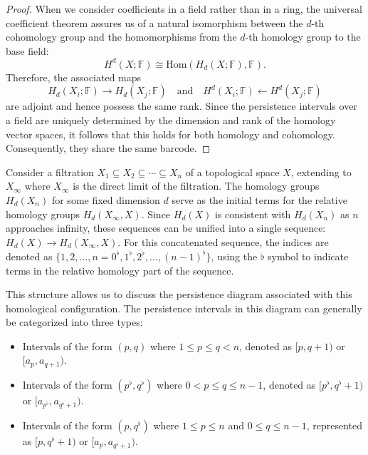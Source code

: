\begin{proof}
	When we consider coefficients in a field rather than in a ring, the universal
	coefficient theorem assures us of a natural isomorphism between the $d$-th
	cohomology group and the homomorphisms from the $d$-th homology group to the
	base field:
	\begin{equation}
		H^{d}(X;\mathbb{F}) \cong \text{Hom}(H_{d}(X;\mathbb{F}),\mathbb{F}).
	\end{equation}
	Therefore, the associated maps
	\begin{equation}
		H_{d}(X_{i};\mathbb{F}) \rightarrow H_{d}(X_{j};\mathbb{F}) \quad \text{and}\quad
		H^{d}(X_{i};\mathbb{F}) \leftarrow H^{d}(X_{j};\mathbb{F})
	\end{equation}
	are adjoint and hence possess the same rank. Since the persistence intervals over
	a field are uniquely determined by the dimension and rank of the homology vector
	spaces, it follows that this holds for both homology and cohomology. Consequently,
	they share the same barcode.
\end{proof}

Consider a filtration $X_{1} \subseteq X_{2} \subseteq \cdots \subseteq X_{n}$ of
a topological space $X$, extending to $X_{\infty}$ where $X_{\infty}$ is the
direct limit of the filtration. The homology groups $H_{d}(X_{n})$ for some fixed
dimension $d$ serve as the initial terms for the relative homology groups $H_{d}(
X_{\infty}, X)$. Since $H_{d}(X)$ is consistent with $H_{d}(X_{n})$ as $n$
approaches infinity, these sequences can be unified into a single sequence:
$H_{d}(X) \to H_{d}(X_{\infty}, X)$. For this concatenated sequence, the indices
are denoted as
$\{1, 2, \ldots, n = 0^{\flat}, 1^{\flat}, 2^{\flat}, \ldots, (n-1)^{\flat}\}$, using
the $\flat$ symbol to indicate terms in the relative homology part of the sequence.

This structure allows us to discuss the persistence diagram associated with this
homological configuration. The persistence intervals in this diagram can
generally be categorized into three types:

\begin{itemize}
	\item Intervals of the form $(p, q)$ where $1 \leq p \leq q < n$, denoted as
		$[p, q+1)$ or $[a_{p}, a_{q+1})$.

	\item Intervals of the form $(p^{\flat}, q^{\flat})$ where $0 < p \leq q \leq n
		-1$, denoted as $[p^{\flat}, q^{\flat}+1)$ or $[a_{p^\flat}, a_{q^\flat+1})$.

	\item Intervals of the form $(p, q^{\flat})$ where $1 \leq p \leq n$ and $0 \leq
		q \leq n-1$, represented as $[p, q^{\flat}+1)$ or $[a_{p}, a_{q^\flat+1})$.
\end{itemize}

